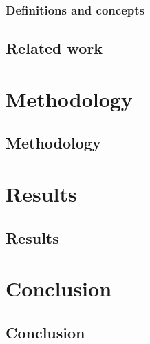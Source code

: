 \documentclass[a4paper, 12pt]{report}
\begin{document}




\subsection{Definitions and concepts}
\newpage

\section{Related work}
\newpage

\chapter{Methodology}
\section{Methodology}
\newpage

\chapter{Results}
\section{Results}
\newpage

\chapter{Conclusion}
\section{Conclusion}

\newpage
\printbibliography
\end{document}
